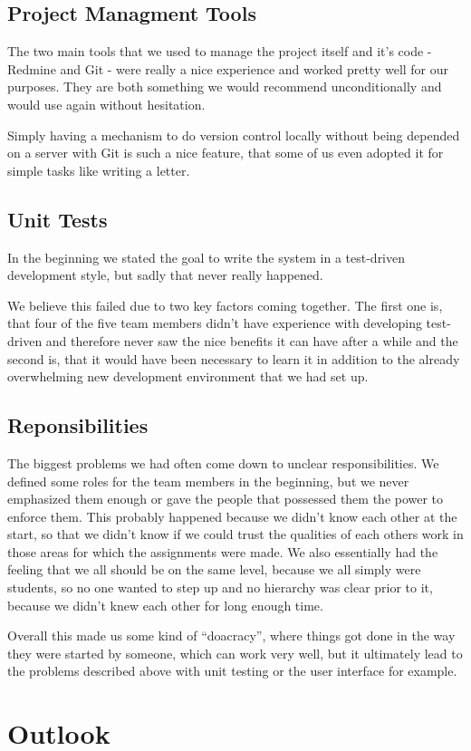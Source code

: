 \subsection{Project Managment Tools}

The two main tools that we used to manage the project itself and it's code - Redmine and Git - were really a nice experience and worked pretty well for our purposes. They are both something we would recommend unconditionally and would use again without hesitation. 

Simply having a mechanism to do version control locally without being depended on a server with Git is such a nice feature, that some of us even adopted it for simple tasks like writing a letter.

\subsection{Unit Tests}

In the beginning we stated the goal to write the system in a test-driven development style, but sadly that never really happened. 

We believe this failed due to two key factors coming together. The first one is, that four of the five team members didn't have experience with developing test-driven and therefore never saw the nice benefits it can have after a while and the second is, that it would have been necessary to learn it in addition to the already overwhelming new development environment that we had set up.

\subsection{Reponsibilities}

The biggest problems we had often come down to unclear responsibilities. We defined some roles for the team members in the beginning, but we never emphasized them enough or gave the people that possessed them the power to enforce them. This probably happened because we didn't know each other at the start, so that we didn't know if we could trust the qualities of each others work in those areas for which the assignments were made. We also essentially had the feeling that we all should be on the same level, because we all simply were students, so no one wanted to step up and no hierarchy was clear prior to it, because we didn't knew each other for long enough time.

Overall this made us some kind of \enquote{doacracy}, where things got done in the way they were started by someone, which can work very well, but it ultimately lead to the problems described above with unit testing or the user interface for example.

\section{Outlook}

